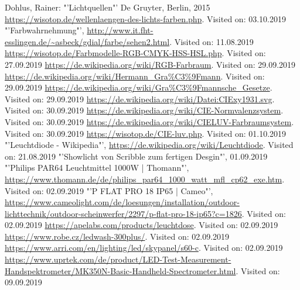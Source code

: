 \documentclass[11pt]{scrartcl}
\begin{document}
{\begin{thebibliography}{xxxxxxxxxxxxxxxxxxx}
     Dohlus, Rainer: "'Lichtquellen"' De Gruyter, Berlin, 2015
     \url{https://wisotop.de/wellenlaengen-des-lichts-farben.php}. Visited on: 03.10.2019
    "'Farbwahrnehmung"', \url{http://www.it.fht-esslingen.de/~asbeck/gdial/farbe/sehen2.html}. Visited on: 11.08.2019
     \url{https://wisotop.de/Farbmodelle-RGB-CMYK-HSS-HSL.php}. Visited on: 27.09.2019
     \url{https://de.wikipedia.org/wiki/RGB-Farbraum}. Visited on: 29.09.2019
     \url{https://de.wikipedia.org/wiki/Hermann\_Gra%C3%9Fmann}. Visited on: 29.09.2019
     \url{https://de.wikipedia.org/wiki/Gra%C3%9Fmannsche_Gesetze}. Visited on: 29.09.2019
     \url{https://de.wikipedia.org/wiki/Datei:CIExy1931.svg}. Visited on: 30.09.2019
     \url{https://de.wikipedia.org/wiki/CIE-Normvalenzsystem}. Visited on: 30.09.2019
     \url{https://de.wikipedia.org/wiki/CIELUV-Farbraumsystem}. Visited on: 30.09.2019
     \url{https://wisotop.de/CIE-luv.php}. Visited on: 01.10.2019
    "'Leuchtdiode - Wikipedia"', \url{https://de.wikipedia.org/wiki/Leuchtdiode}. Visited on: 21.08.2019
    "'Showlicht von Scribble zum fertigen Desgin"', 01.09.2019
    "'Philips PAR64 Leuchtmittel 1000W | Thomann"', \url{https://www.thomann.de/de/philips_par64_1000_watt_mfl_cp62_exe.htm}. Visited on: 02.09.2019
    "'P FLAT PRO 18 IP65 | Cameo"', \url{https://www.cameolight.com/de/loesungen/installation/outdoor-lichttechnik/outdoor-scheinwerfer/2297/p-flat-pro-18-ip65?c=1826}. Visited on: 02.09.2019
     \url{https://apelabs.com/products/leuchtdose}. Visited on: 02.09.2019
     \url{https://www.robe.cz/ledwash-300plus/}. Visited on: 02.09.2019
     \url{https://www.arri.com/en/lighting/led/skypanel/s60-c}. Visited on: 02.09.2019
     \url{https://www.uprtek.com/de/product/LED-Test-Measurement-Handspektrometer/MK350N-Basic-Handheld-Spectrometer.html}. Visited on: 09.09.2019

\end{thebibliography}}
\end{document}
